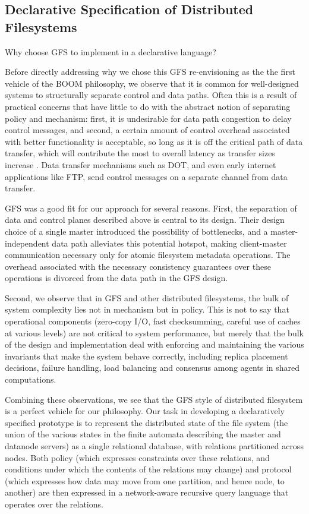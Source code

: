 \documentclass{article}
\begin{document}
\subsection{Declarative Specification of Distributed Filesystems}
Why choose GFS to implement in a declarative language?

Before directly addressing why we chose this GFS re-envisioning as the the first vehicle of the BOOM philosophy, we observe that it is common for well-designed systems to structurally separate control and data paths.  Often this is a result of practical concerns that have little to do with the abstract notion of separating policy and mechanism: first, it is undesirable for data path congestion to delay control messages, and second, a certain amount of control overhead associated with better functionality is acceptable, so long as it is off the critical path of data transfer, which will contribute the most to overall latency as transfer sizes increase .  Data transfer mechanisms such as DOT, and even early internet applications like FTP, send control messages on a separate channel from data transfer.

GFS was a good fit for our approach for several reasons.  First, the separation of data and control planes described above is central to its design.  Their design choice of a single master introduced the possibility of bottlenecks, and a master-independent data path alleviates this potential hotspot, making client-master communication necessary only for atomic filesystem metadata operations.   The overhead associated with the necessary consistency guarantees over these operations is divorced from the data path in the GFS design.

Second, we observe that in GFS and other distributed filesystems, the bulk of system complexity lies not in mechanism but in policy.  This is not to say that operational components (zero-copy I/O, fast checksumming, careful use of caches at various levels) are not critical to system performance, but merely that the bulk of the design and implementation deal with enforcing and maintaining the various invariants that make the system behave correctly, including replica placement decisions, failure handling, load balancing and consensus among agents in shared computations.

Combining these observations, we see that the GFS style of distributed filesystem is a perfect vehicle for our philosophy.  Our task in developing a declaratively specified prototype is to represent the distributed state of the file system (the union of the various states in the finite automata describing the master and datanode servers) as a single relational database, with relations partitioned across nodes.  Both policy (which expresses constraints over these relations, and conditions under which the contents of the relations may change) and protocol (which expresses how data may move from one partition, and hence node,  to another) are then expressed in a network-aware recursive query language that operates over the relations.
\end{document}
